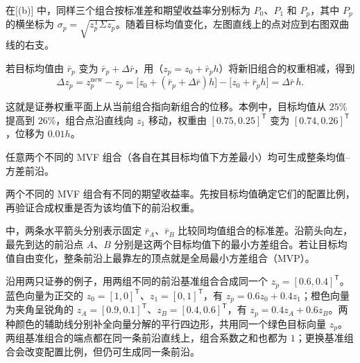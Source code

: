 在[(b)] 中，同样三个组合按标准差和期望收益率分别标为 $P_0$、$P_1$ 和 $P_p$，其中 $P_p$ 的横坐标为 $\sigma_p=\sqrt{z_p^{\mathsf T}\Sigma z_p}$。随着目标均值变化，左图直线上的点对应到右图双曲线的右支。

\begin{center}
\begin{minipage}{\linewidth}
\centering
\renewcommand{\thewjFigure}{\thechapter.S\arabic{wjFigure}}%
%
\par
{}
\end{minipage}
\end{center}

若目标均值由 $\bar r_p$ 变为 $\bar r_p+\Delta\bar r$，用（$z_p=z_0+\bar r_p h$）将新旧组合的权重相减，得到
\[
 \Delta z_p=z_p^{\mathrm{new}}-z_p
 =\bigl[z_0+(\bar r_p+\Delta\bar r)h\bigr]
  -\bigl[z_0+\bar r_p h\bigr]
 =\Delta\bar r\,h.
\]

这就是证券权重平面上从当前组合指向新组合的位移。本例中，目标均值从 $25\%$ 提高到 $26\%$，组合点沿直线向 $z_1$ 移动，权重由 $[0.75,0.25]^{\mathsf T}$ 变为 $[0.74,0.26]^{\mathsf T}$，位移为 $0.01h$。

\begin{tcolorbox}[knowledge]
 任意两个不同的 MVF 组合（各自在其目标均值下方差最小）均可生成整条均值--方差前沿。
\end{tcolorbox}

两个不同的 MVF 组合有不同的期望收益率。先按目标均值确定它们的配置比例，再验证合成权重是否为该均值下的前沿权重。

 中，两条水平箭头分别表示固定 $\bar r_A$、$\bar r_B$ 比较同均值组合的标准差。沿箭头向左，最先到达的前沿点 $A$、$B$ 分别是这两个目标均值下的最小方差组合。若让目标均值自由变化，整条前沿上最靠左的顶点就是全局最小方差组合（MVP）。

沿用两只证券的例子，用两组不同的前沿基准组合合成同一个 $z_p=[0.6,0.4]^{\mathsf T}$。蓝色向量为正交的 $z_0=[1,0]^{\mathsf T}$、$z_1=[0,1]^{\mathsf T}$，有 $z_p=0.6z_0+0.4z_1$；橙色向量为夹角呈锐角的 $z_A=[0.9,0.1]^{\mathsf T}$、$z_B=[0.4,0.6]^{\mathsf T}$，有 $z_p=0.4z_A+0.6z_B$。两种颜色的辅助线分别补全向量分解的平行四边形，共用同一个绿色目标向量 $z_p$。两组基准组合的端点都在同一条前沿直线上，组合系数之和也都为 $1$；更换基准组合会改变配置比例，但仍可生成同一条前沿。

